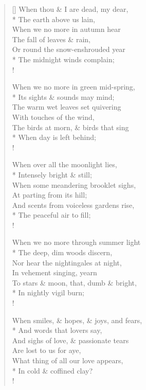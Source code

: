 \documentclass[MAIN]{subfiles}
\begin{document}
\settowidth{\versewidth}{The birds at morn, \& birds that sing}
\begin{verse}[\versewidth]
When thou \& I are dead, my dear,\\*
\vin The earth above us lain,\\
When we no more in autumn hear\\
\vin The fall of leaves \& rain,\\
Or round the snow-enshrouded year\\*
\vin The midnight winds complain;\\!

When we no more in green mid-spring,\\*
\vin Its sights \& sounds may mind;\\
The warm wet leaves set quivering\\
\vin With touches of the wind,\\
The birds at morn, \& birds that sing\\*
\vin When day is left behind;\\!

When over all the moonlight lies,\\*
\vin Intensely bright \& still;\\
When some meandering brooklet sighs,\\
\vin At parting from its hill;\\
And scents from voiceless gardens rise,\\*
\vin The peaceful air to fill;\\!

When we no more through summer light\\*
\vin The deep, dim woods discern,\\
Nor hear the nightingales at night,\\
\vin In vehement singing, yearn\\
To stars \& moon, that, dumb \& bright,\\*
\vin In nightly vigil burn;\\!

When smiles, \& hopes, \& joys, and fears,\\*
\vin And words that lovers say,\\
And sighs of love, \& passionate tears\\
\vin Are lost to us for aye,\\
What thing of all our love appears,\\*
\vin In cold \& coffined clay?\\!


\end{verse}
\end{document}
